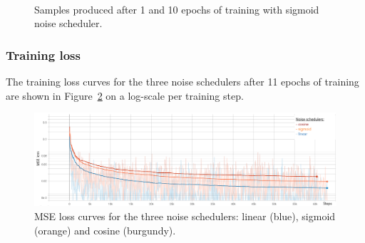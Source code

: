 \documentclass[fullpaper]{nldl}
\begin{document}
\begin{figure}[h!]
	\centering
	\\
	\caption{Samples produced after 1 and 10 epochs of training with sigmoid noise scheduler. \label{fig:sigmoid}}
\end{figure}


\subsubsection{Training loss}
\label{subsubsect:Res-Loss}
The training loss curves for the three noise schedulers after 11 epochs of training are shown in Figure~\ref{fig:losses} on a log-scale per training step.
\begin{figure}[t!]
	\centering
	\includegraphics[width=1\linewidth,height=0.15\textheight]{Loss_curves.png}
	\caption{MSE loss curves for the three noise schedulers: linear (blue), sigmoid (orange) and cosine (burgundy). \label{fig:losses}}
\end{figure}
\end{document}
